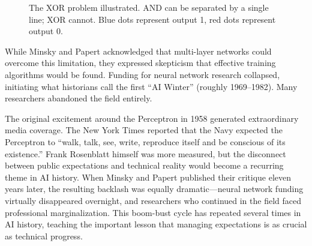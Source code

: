 \begin{figure}[htbp]
\centering
{}
\caption{The XOR problem illustrated. AND can be separated by a single line; XOR cannot. Blue dots represent output 1, red dots represent output 0.}
\label{fig:xor_problem}
\end{figure}

While Minsky and Papert acknowledged that multi-layer networks could overcome this limitation, they expressed skepticism that effective training algorithms would be found. Funding for neural network research collapsed, initiating what historians call the first ``AI Winter'' (roughly 1969--1982). Many researchers abandoned the field entirely.

\begin{historicalbox}
The original excitement around the Perceptron in 1958 generated extraordinary media coverage. The New York Times reported that the Navy expected the Perceptron to ``walk, talk, see, write, reproduce itself and be conscious of its existence.'' Frank Rosenblatt himself was more measured, but the disconnect between public expectations and technical reality would become a recurring theme in AI history. When Minsky and Papert published their critique eleven years later, the resulting backlash was equally dramatic---neural network funding virtually disappeared overnight, and researchers who continued in the field faced professional marginalization. This boom-bust cycle has repeated several times in AI history, teaching the important lesson that managing expectations is as crucial as technical progress.
\end{historicalbox}

